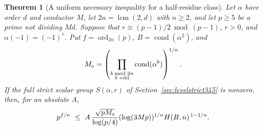 \documentclass[a4paper,11pt]{article}
\newtheorem{theorem}[proposition]{Theorem}
\theoremstyle{definition}
\theoremstyle{remark}
\numberwithin{equation}{section}
\begin{document}
\begin{theorem}[A uniform necessary inequality for a half-residue class]
\leavevmode\label{thm:relhalf633}
Let \(\alpha\) have order \(d\) and conductor \(M\), let
\(2n=\operatorname{lcm}(2,d)\) with \(n\ge2\), and let \(p\ge5\)
be a prime not dividing \(Md\). Suppose that
\(r\equiv(p-1)/2\bmod(p-1)\), \(r>0\), and
\(\alpha(-1)=(-1)^r\). Put \(f=\operatorname{ord}_{2n}(p)\),
\(B=\operatorname{cond}(\alpha^2)\), and
\[
 M_{\rm o}=\left(\prod_{\substack{b\bmod 2n\\ b\ {\rm odd}}}
                     \operatorname{cond}(\alpha^b)\right)^{1/n}.
\]
If the full strict scalar group \(S(\alpha,r)\) of
Section~\ref{sec:levelstrict345} is nonzero, then, for an absolute \(A\),
\[
 p^{f/n}\ \le\
 A\,\frac{\sqrt{p M_{\rm o}}}{\log(p/4)}
       (\log(3Mp))^{1/n} H(B,n)^{\,1-1/n}.
\]
\end{theorem}
\end{document}
